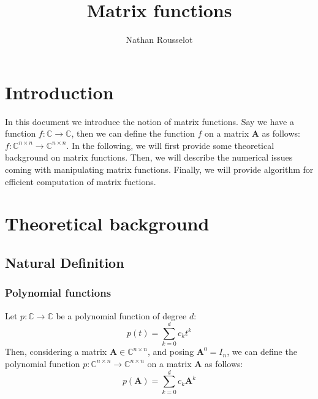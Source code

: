 \documentclass[11pt]{article}
\title{Matrix functions} %
\author{Nathan Rousselot}
\begin{document}
\maketitle

\section{Introduction}
In this document we introduce the notion of matrix functions. Say we have a function $f:\mathbb{C}\rightarrow\mathbb{C}$, then we can define the function $f$ on a matrix $\mathbf{A}$ as follows: $f:\mathbb{C}^{n\times n}\rightarrow\mathbb{C}^{n\times n}$. In the following, we will first provide some theoretical background on matrix functions. Then, we will describe the numerical issues coming with manipulating matrix functions. Finally, we will provide algorithm for efficient computation of matrix fuctions.

\section{Theoretical background}
\subsection{Natural Definition}
\subsubsection*{Polynomial functions}
Let $p:\mathbb{C}\rightarrow\mathbb{C}$ be a polynomial function of degree $d$:
\begin{equation}
    p(t) = \sum_{k=0}^d c_k t^k
\end{equation}
Then, considering a matrix $\mathbf{A}\in\mathbb{C}^{n\times n}$, and posing $\mathbf{A}^0 = I_n$, we can define the polynomial function $p:\mathbb{C}^{n\times n}\rightarrow\mathbb{C}^{n\times n}$ on a matrix $\mathbf{A}$ as follows:
\begin{equation}
    p(\mathbf{A}) = \sum_{k=0}^d c_k \mathbf{A}^k
\end{equation}
\end{document}
